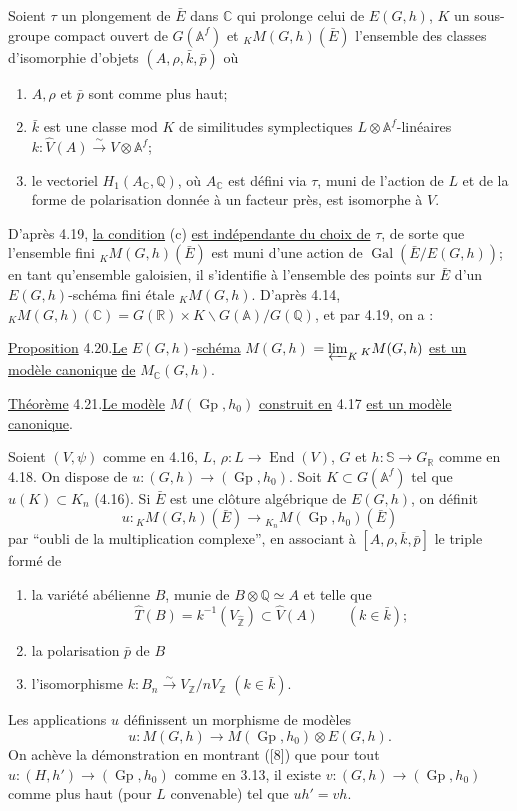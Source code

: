 \documentclass[10pt]{article}
\newcommand{\A}{\mathbb A}
\newcommand{\Af}{\mathbb A^f}
\newcommand{\C}{\mathbb C}
\newcommand{\Q}{\mathbb Q}
\newcommand{\R}{\mathbb R}
\newcommand{\Z}{\mathbb Z}
\newcommand{\bS}{\mathbb S}
\newcommand{\Gp}{\operatorname{Gp}}
\newcommand{\Gal}{\operatorname{Gal}}
\newcommand{\End}{\operatorname{End}}
\begin{document}
Soient $\tau$ un plongement de $\bar E$ dans $\C$ qui prolonge celui de $E(G,h)$, $K$ un sous-groupe compact ouvert de $G(\Af)$ et ${}_K M(G,h)(\bar E)$ l'ensemble des classes d'isomorphie d'objets $(A,\rho,\bar k,\bar p)$ où
\begin{enumerate}[label=(\alph*)]
\item $A,\rho$ et $\bar p$ sont comme plus haut;
\item $\bar k$ est une classe mod $K$ de similitudes symplectiques $L\otimes\Af$-linéaires $k:\widehat V(A)\xrightarrow{\sim}V\otimes\Af$;
\item le vectoriel $H_1(A_\C,\Q)$, où $A_\C$ est défini via $\tau$, muni de l'action de $L$ et de la forme de polarisation donnée à un facteur près, est isomorphe à $V$.
\end{enumerate}
D'après 4.19, \uline{la condition} (c) \uline{est indépendante du choix de} $\tau$, de sorte que l'ensemble fini ${}_K M(G,h)(\bar E)$ est muni d'une action de $\Gal(\bar E/E(G,h))$; en tant qu'ensemble galoisien, il s'identifie à l'ensemble des points sur $\bar E$ d'un $E(G,h)$-schéma fini étale ${}_K M(G,h)$. D'après 4.14, ${}_K M(G,h)(\C)=G(\R)\times K\backslash G(\A)/G(\Q)$, et par 4.19, on a :

\noindent \uline{Proposition} 4.20.\quad \uline{Le} $E(G,h)$-\uline{schéma} \uline{$M(G,h)$} $=\varprojlim_K {}_K M(G,h)$ \uline{est un modèle canonique} \uline{de} $M_{\C}(G,h)$.

\noindent \uline{Théorème} 4.21.\quad \uline{Le modèle} $M(\Gp,h_0)$ \uline{construit en} 4.17 \uline{est un modèle canonique}.

Soient $(V,\psi)$ comme en 4.16, $L$, $\rho:L\to\End(V)$, $G$ et $h:\bS\to G_\R$ comme en 4.18. On dispose de $u:(G,h)\longrightarrow(\Gp,h_0)$. Soit $K\subset G(\Af)$ tel que $u(K)\subset K_n$ (4.16). Si $\bar E$ est une clôture algébrique de $E(G,h)$, on définit
\[
u:{}_K M(G,h)(\bar E)\longrightarrow{}_{K_n}M(\Gp,h_0)(\bar E)
\]
par ``oubli de la multiplication complexe'', en associant à $[A,\rho,\bar k,\bar p]$ le triple formé de
\begin{enumerate}[label=(\alph*)]
\item la variété abélienne $B$, munie de $B\otimes\Q\simeq A$ et telle que
\[
\widehat T(B)=k^{-1}(V_{\widehat{\Z}})\subset\widehat V(A)\qquad(k\in\bar k);
\]
\item la polarisation $\bar p$ de $B$
\item l'isomorphisme $k:B_n\xrightarrow{\sim}V_\Z/nV_\Z$ $(k\in\bar k)$.
\end{enumerate}
Les applications $u$ définissent un morphisme de modèles
\[
u:M(G,h)\longrightarrow M(\Gp,h_0)\otimes E(G,h).
\]
On achève la démonstration en montrant ([8]) que pour tout $u:(H,h')\longrightarrow(\Gp,h_0)$ comme en 3.13, il existe $v:(G,h)\longrightarrow(\Gp,h_0)$ comme plus haut (pour $L$ convenable) tel que $uh'=vh$.
\end{document}
